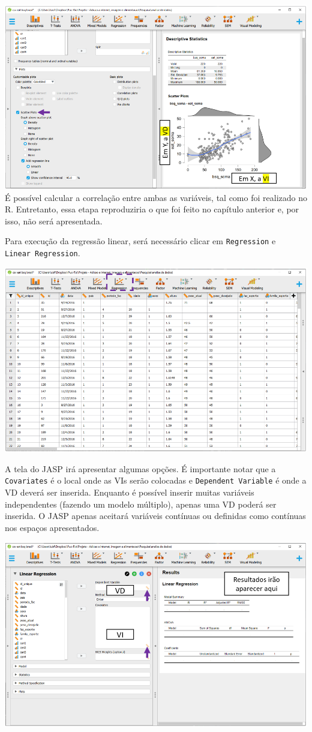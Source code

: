 \documentclass[
]{book}
\begin{document}
\includegraphics{./img/cap_reg_plot2.png} É possível calcular a
correlação entre ambas as variáveis, tal como foi realizado no R.
Entretanto, essa etapa reproduziria o que foi feito no capítulo anterior
e, por isso, não será apresentada.

Para execução da regressão linear, será necessário clicar em
\texttt{Regression} e \texttt{Linear\ Regression}.

\includegraphics{./img/cap_reg_multipla_interface.png}

A tela do JASP irá apresentar algumas opções. É importante notar que a
\texttt{Covariates} é o local onde as VIs serão colocadas e
\texttt{Dependent\ Variable} é onde a VD deverá ser inserida. Enquanto é
possível inserir muitas variáveis independentes (fazendo um modelo
múltiplo), apenas uma VD poderá ser inserida. O JASP apenas aceitará
variáveis contínuas ou definidas como contínuas nos espaços
apresentados.

\includegraphics{./img/cap_reg_interface.png}
\end{document}
